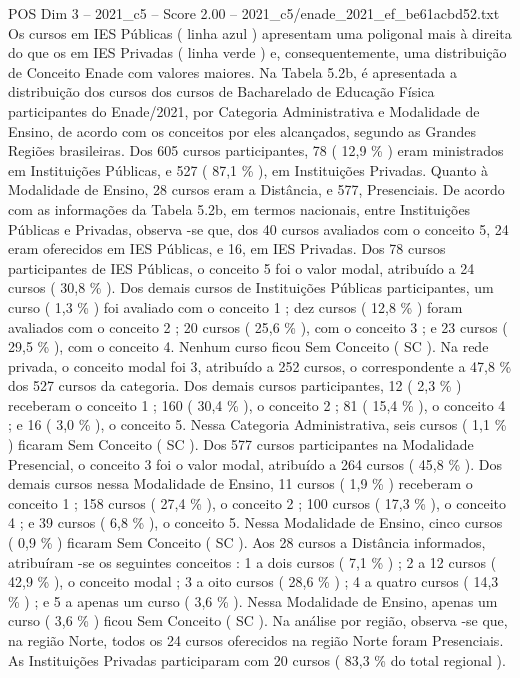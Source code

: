 \begin{textsample}{POS Dim 3 – 2021\_c5 – Score 2.00 – 2021\_c5/enade\_2021\_ef\_be61acbd52.txt}
Os cursos em IES Públicas ( linha azul ) apresentam uma poligonal mais à direita do que os em IES Privadas ( linha verde ) e, consequentemente, uma distribuição de Conceito Enade com valores maiores.
Na Tabela 5.2b, é apresentada a distribuição dos cursos dos cursos de Bacharelado de Educação Física participantes do Enade/2021, por Categoria Administrativa e Modalidade de Ensino, de acordo com os conceitos por eles alcançados, segundo as Grandes Regiões brasileiras.
Dos 605 cursos participantes, 78 ( 12,9 \% ) eram ministrados em Instituições Públicas, e 527 ( 87,1 \% ), em Instituições Privadas.
Quanto à Modalidade de Ensino, 28 cursos eram a Distância, e 577, Presenciais.
De acordo com as informações da Tabela 5.2b, em termos nacionais, entre Instituições Públicas e Privadas, observa -se que, dos 40 cursos avaliados com o conceito 5, 24 eram oferecidos em IES Públicas, e 16, em IES Privadas.
Dos 78 cursos participantes de IES Públicas, o conceito 5 foi o valor modal, atribuído a 24 cursos ( 30,8 \% ).
Dos demais cursos de Instituições Públicas participantes, um curso ( 1,3 \% ) foi avaliado com o conceito 1 ; dez cursos ( 12,8 \% ) foram avaliados com o conceito 2 ; 20 cursos ( 25,6 \% ), com o conceito 3 ; e 23 cursos ( 29,5 \% ), com o conceito 4.
Nenhum curso ficou Sem Conceito ( SC ).
Na rede privada, o conceito modal foi 3, atribuído a 252 cursos, o correspondente a 47,8 \% dos 527 cursos da categoria.
Dos demais cursos participantes, 12 ( 2,3 \% ) receberam o conceito 1 ; 160 ( 30,4 \% ), o conceito 2 ; 81 ( 15,4 \% ), o conceito 4 ; e 16 ( 3,0 \% ), o conceito 5.
Nessa Categoria Administrativa, seis cursos ( 1,1 \% ) ficaram Sem Conceito ( SC ).
Dos 577 cursos participantes na Modalidade Presencial, o conceito 3 foi o valor modal, atribuído a 264 cursos ( 45,8 \% ).
Dos demais cursos nessa Modalidade de Ensino, 11 cursos ( 1,9 \% ) receberam o conceito 1 ; 158 cursos ( 27,4 \% ), o conceito 2 ; 100 cursos ( 17,3 \% ), o conceito 4 ; e 39 cursos ( 6,8 \% ), o conceito 5.
Nessa Modalidade de Ensino, cinco cursos ( 0,9 \% ) ficaram Sem Conceito ( SC ).
Aos 28 cursos a Distância informados, atribuíram -se os seguintes conceitos : 1 a dois cursos ( 7,1 \% ) ; 2 a 12 cursos ( 42,9 \% ), o conceito modal ; 3 a oito cursos ( 28,6 \% ) ; 4 a quatro cursos ( 14,3 \% ) ; e 5 a apenas um curso ( 3,6 \% ).
Nessa Modalidade de Ensino, apenas um curso ( 3,6 \% ) ficou Sem Conceito ( SC ).
Na análise por região, observa -se que, na região Norte, todos os 24 cursos oferecidos na região Norte foram Presenciais.
As Instituições Privadas participaram com 20 cursos ( 83,3 \% do total regional ).

\end{textsample}
